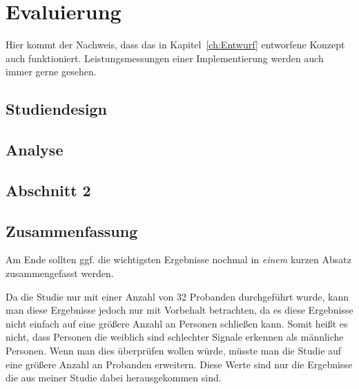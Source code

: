 
\chapter{Evaluierung}
\label{ch:Evaluierung}
Hier kommt der Nachweis, dass das in Kapitel~\ref{ch:Entwurf}
entworfene Konzept auch funktioniert. Leistungsmessungen einer
Implementierung werden auch immer gerne gesehen.


\section{Studiendesign}
\label{ch:Implementierung:sec:Studiendesign}







\section{Analyse}
\label{ch:Evaluierung:sec:Abschnitt1}



\section{Abschnitt 2}
\label{ch:Evaluierung:sec:Abschnitt2}



\section{Zusammenfassung}
\label{ch:Evaluierung:sec:zusammenfassung}

Am Ende sollten ggf. die wichtigsten Ergebnisse nochmal in \emph{einem}
kurzen Absatz zusammengefasst werden.

Da die Studie nur mit einer Anzahl von 32 Probanden durchgef{\"u}hrt wurde, kann man diese Ergebnisse jedoch nur mit Vorbehalt betrachten, da es diese Ergebnisse nicht einfach auf eine gr{\"o}{\ss}ere Anzahl an Personen schlie{\ss}en kann. 
Somit hei{\ss}t es nicht, dass Personen die weiblich sind schlechter Signale erkennen als m{\"a}nnliche Personen. Wenn man dies {\"u}berpr{\"u}fen wollen w{\"u}rde, m{\"u}sste man die Studie auf eine gr{\"o}{\ss}ere Anzahl an Probanden erweitern. Diese Werte sind nur die Ergebnisse die aus meiner Studie dabei herausgekommen sind.

